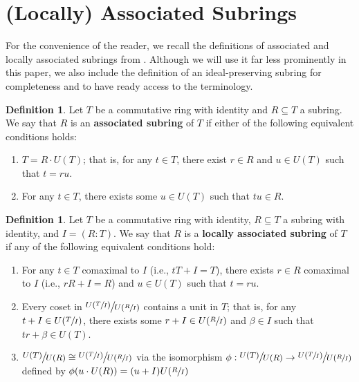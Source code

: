 \documentclass[12pt]{amsart}
\theoremstyle{definition}
\newtheorem{definition}[theorem]{Definition}
\newcommand{\term}[1]{\textbf{\textup{#1}}}
\newcommand{\quot}[2]{\large\sfrac{#1}{#2}\normalsize}
\begin{document}
\section{(Locally) Associated Subrings}

For the convenience of the reader, we recall the definitions of associated and locally associated subrings from \cite{subringrelations}. Although we will use it far less prominently in this paper, we also include the definition of an ideal-preserving subring for completeness and to have ready access to the terminology.

\begin{definition}
    \label{associated}
    Let $T$ be a commutative ring with identity and $R\subseteq T$ a subring. We say that $R$ is an \term{associated subring} of $T$ if either of the following equivalent conditions holds:
    \begin{enumerate}
        \item $T=R\cdot U(T)$; that is, for any $t\in T$, there exist $r\in R$ and $u\in U(T)$ such that $t=ru$.
        \item For any $t\in T$, there exists some $u\in U(T)$ such that $tu\in R$.
    \end{enumerate}
\end{definition}

\begin{definition}
    \label{locally associated}
    Let $T$ be a commutative ring with identity, $R\subseteq T$ a subring with identity, and $I=(R:T)$. We say that $R$ is a \term{locally associated subring} of $T$ if any of the following equivalent conditions hold:
    \begin{enumerate}
        \item For any $t\in T$ comaximal to $I$ (i.e., $tT+I=T$), there exists $r\in R$ comaximal to $I$ (i.e., $rR+I=R$) and $u\in U(T)$ such that $t=ru$.
        \item Every coset in $\quot{U(\sfrac{T}{I})}{U(\sfrac{R}{I})}$ contains a unit in $T$; that is, for any $t+I\in U(\sfrac{T}{I})$, there exists some $r+I\in U(\sfrac{R}{I})$ and $\beta\in I$ such that $tr+\beta\in U(T)$.
        \item $\quot{U(T)}{U(R)}\cong \quot{U(\sfrac{T}{I})}{U(\sfrac{R}{I})}$ via the isomorphism $\phi:\quot{U(T)}{U(R)}\to \quot{U(\sfrac{T}{I})}{U(\sfrac{R}{I})}$ defined by $\phi(u\cdot U(R))=(u+I)U(\sfrac{R}{I})$
    \end{enumerate}
\end{definition}
\end{document}
